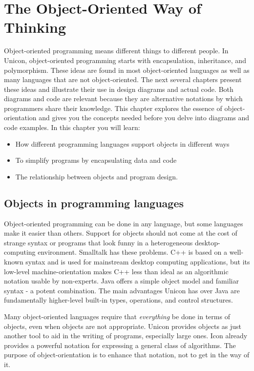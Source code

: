 \chapter{The Object-Oriented Way of Thinking}

Object-oriented programming means
different things to different people. In Unicon, object-oriented
programming starts with encapsulation, inheritance, and polymorphism.
These ideas are found in most object-oriented languages as well as many
languages that are not object-oriented. The next several chapters
present these ideas and illustrate their use in design diagrams and
actual code. Both diagrams and code are relevant because they are
alternative notations by which programmers share their knowledge. This
chapter explores the essence of object-orientation and gives you the
concepts needed before you delve into diagrams and code examples. In
this chapter you will learn:
\begin{itemize}
\item How different programming languages support objects in different ways
\item To simplify programs by encapsulating data and code
\item The relationship between objects and program design.
\end{itemize}

\section{Objects in programming languages}

Object-oriented programming can be done in any language, but some
languages make it easier than others. Support for objects should not
come at the cost of strange syntax or programs that look funny in a
heterogeneous desktop-computing environment. Smalltalk
has these problems. C++ is based on a well-known syntax and is used for
mainstream desktop computing applications, but its low-level
machine-orientation makes C++ less than ideal as an algorithmic
notation usable by non-experts. Java offers a simple object
model and familiar syntax - a potent combination. The main advantages
Unicon has over Java are fundamentally higher-level built-in types,
operations, and control structures.

Many object-oriented languages require that \textit{everything} be done
in terms of objects, even when objects are not appropriate. Unicon
provides objects as just another tool to aid in the writing of
programs, especially large ones. Icon already provides a powerful
notation for expressing a general class of algorithms. The purpose of
object-orientation is to enhance that notation, not to get in the way
of it.

